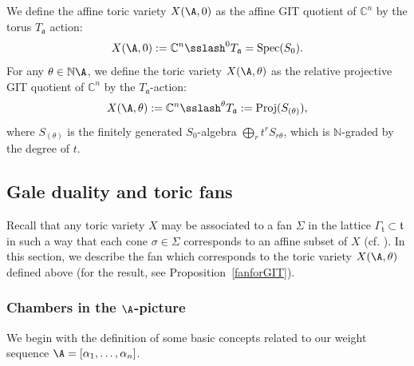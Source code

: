 We define the affine toric variety $X(\A,0)$ as the affine GIT quotient of $\mathbb{C}^n$ by the torus $T_{\mathfrak{a}}$ action:
$$ X(\A,0) := \mathbb{C}^n\sslash^0 T_{\mathfrak{a}}  = 
\mathrm{Spec}(S_0).$$   \label{X_0def}
For any $\theta \in \mathbb{N}\A$, we define the toric variety $X(\A,\theta)$ as the relative projective GIT quotient of $\mathbb{C}^n$ by the  $T_{\mathfrak{a}}$-action:
$$X(\A,\theta) := \mathbb{C}^n\sslash^\theta{T_{\mathfrak{a}}} : = \mathrm{Proj}(S_{(\theta)}),$$
where $S_{(\theta)}$ is the finitely generated $S_0$-algebra $\bigoplus_r t^r S_{r\theta}$, which is $\mathbb{N}$-graded by the degree of $t$.

\subsection{Gale duality and toric fans}\label{S2.2} 
Recall that any toric variety $X$ may be associated to a fan $\Sigma$ in the 
lattice $\Gamma_\mathfrak{t}\subset\mathfrak{t}$ in such a way that each cone 
$\sigma\in\Sigma$ corresponds to an affine subset of  $X$ (cf.  
\cite[\S1.4]{Fulton}). 
In this section, we describe the fan which corresponds to the toric variety 
$X(\A,\theta)$ defined above (for the result, see Proposition~\ref{fanforGIT}). 


\subsubsection{Chambers in the \texorpdfstring{$\A$}{A}-picture}
We begin with the definition of some basic concepts related to our weight 
sequence $\A=[\alpha_1, \ldots,\alpha_n]$.

